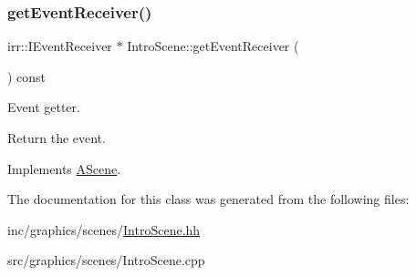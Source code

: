 \subsubsection{\texorpdfstring{get\+Event\+Receiver()}{getEventReceiver()}}
{\footnotesize\ttfamily irr\+::\+I\+Event\+Receiver $\ast$ Intro\+Scene\+::get\+Event\+Receiver (\begin{DoxyParamCaption}{ }\end{DoxyParamCaption}) const\hspace{0.3cm}{\ttfamily [virtual]}}



Event getter. 

Return the event. 

Implements \hyperlink{classAScene_af521e5e6d30a5d2e5d30eb333e4d3abd}{A\+Scene}.



The documentation for this class was generated from the following files\+:\begin{DoxyCompactItemize}
\item 
inc/graphics/scenes/\hyperlink{IntroScene_8hh}{Intro\+Scene.\+hh}\item 
src/graphics/scenes/Intro\+Scene.\+cpp\end{DoxyCompactItemize}
